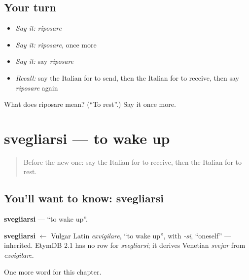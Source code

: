 \subsection*{Your turn}
\begin{itemize}
\raggedright
  \item \emph{Say it:} \emph{riposare}
  \item \emph{Say it:} \emph{riposare}, once more
  \item \emph{Say it:} say \emph{riposare}
  \item \emph{Recall:} say the Italian for to send, then the Italian for to receive, then say \emph{riposare} again
\end{itemize}

\begin{tcolorbox}[breakable,colback=teal!4,colframe=teal!35!black,title={Before you move on}]
What does riposare mean? (\textquotedblleft{}To rest\textquotedblright{}.) Say it once more.
\end{tcolorbox}
\section[svegliarsi]{svegliarsi — to wake up}

\label{lesson:IT-C236-svegliarsi}



\begin{quote}
Before the new one: say the Italian for to receive, then the Italian for to rest.
\end{quote}

\subsection*{You'll want to know: svegliarsi}
\textbf{svegliarsi} — \textquotedblleft{}to wake up\textquotedblright{}.

\begin{cousinweb}
\textbf{svegliarsi} $\leftarrow$ Vulgar Latin \emph{exvigilare}, \textquotedblleft{}to wake up\textquotedblright{}, with \emph{-si}, \textquotedblleft{}oneself\textquotedblright{} — inherited. EtymDB 2.1 has no row for \emph{svegliarsi}; it derives Venetian \emph{svejar} from \emph{exvigilare}.
\end{cousinweb}

\begin{grammarlens}[title={What you've built}]
One more word for this chapter.
\end{grammarlens}

